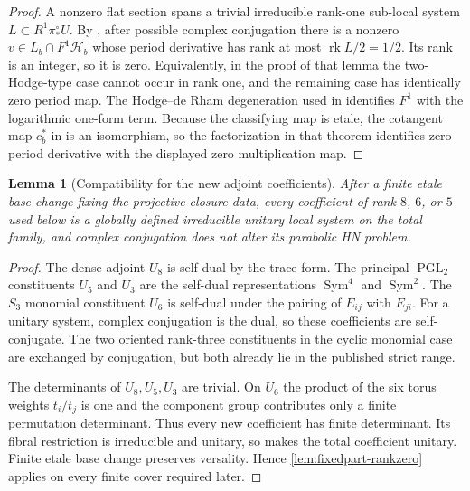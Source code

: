 \documentclass[11pt]{article}
\newtheorem{lemma}[theorem]{Lemma}
\theoremstyle{definition}
\newcommand{\rk}{\operatorname{rk}}
\newcommand{\PGL}{\operatorname{PGL}}
\begin{document}
\begin{proof}
A nonzero flat section spans a trivial irreducible rank-one sub-local system
$L\subset R^1\pi_*^\circ U$.  By \cite[Lemma 6.1.1]{LLCan}, after possible
complex conjugation there is a nonzero $v\in L_b\cap F^1\mathcal H_b$ whose
period derivative has rank at most $\rk L/2=1/2$.  Its rank is an integer,
so it is zero.  Equivalently, in the proof of that lemma the two-Hodge-type
case cannot occur in rank one, and the remaining case has identically zero
period map.  The Hodge--de Rham degeneration used in
\cite[Theorem 4.1.1]{LLCan} identifies $F^1$ with the logarithmic one-form
term.  Because the classifying map is etale, the cotangent map $c_b^*$ in
\cite[Theorem 5.1.6]{LLCan} is an isomorphism, so the factorization in that
theorem identifies zero period derivative with the displayed zero
multiplication map.
\end{proof}

\begin{lemma}[Compatibility for the new adjoint coefficients]
\label{lem:coefficient-unitarity}
After a finite etale base change fixing the projective-closure data, every
coefficient of rank $8$, $6$, or $5$ used below is a globally defined
irreducible unitary local system on the total family, and complex conjugation
does not alter its parabolic HN problem.
\end{lemma}

\begin{proof}
The dense adjoint $U_8$ is self-dual by the trace form.  The principal
$\PGL_2$ constituents $U_5$ and $U_3$ are the self-dual representations
$\operatorname{Sym}^4$ and $\operatorname{Sym}^2$.  The $S_3$ monomial
constituent $U_6$ is self-dual under the pairing of $E_{ij}$ with $E_{ji}$.
For a unitary system, complex conjugation is the dual, so these coefficients
are self-conjugate.  The two oriented rank-three constituents in the cyclic
monomial case are exchanged by conjugation, but both already lie in the
published strict range.

The determinants of $U_8,U_5,U_3$ are trivial.  On $U_6$ the product of the
six torus weights $t_i/t_j$ is one and the component group contributes only
a finite permutation determinant.  Thus every new coefficient has finite
determinant.  Its fibral restriction is irreducible and unitary, so
\cite[Lemma 2.4.1]{LLCan} makes the total coefficient unitary.  Finite etale
base change preserves versality.  Hence \cref{lem:fixedpart-rankzero} applies
on every finite cover required later.
\end{proof}
\end{document}
